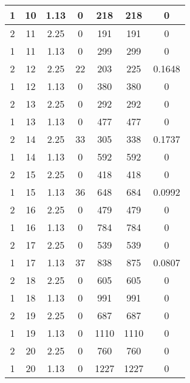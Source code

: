\documentclass[letterpaper, 12pt]{article}
\begin{document}
\begin{longtable}{|c|c|c|c|c|c|c|}
\hline
1 & 10 & 1.13 & 0 & 218 & 218 & 0 \\
\hline
2 & 11 & 2.25 & 0 & 191 & 191 & 0 \\
\hline
1 & 11 & 1.13 & 0 & 299 & 299 & 0 \\
\hline
2 & 12 & 2.25 & 22 & 203 & 225 & 0.1648 \\
\hline
1 & 12 & 1.13 & 0 & 380 & 380 & 0 \\
\hline
2 & 13 & 2.25 & 0 & 292 & 292 & 0 \\
\hline
1 & 13 & 1.13 & 0 & 477 & 477 & 0 \\
\hline
2 & 14 & 2.25 & 33 & 305 & 338 & 0.1737 \\
\hline
1 & 14 & 1.13 & 0 & 592 & 592 & 0 \\
\hline
2 & 15 & 2.25 & 0 & 418 & 418 & 0 \\
\hline
1 & 15 & 1.13 & 36 & 648 & 684 & 0.0992 \\
\hline
2 & 16 & 2.25 & 0 & 479 & 479 & 0 \\
\hline
1 & 16 & 1.13 & 0 & 784 & 784 & 0 \\
\hline
2 & 17 & 2.25 & 0 & 539 & 539 & 0 \\
\hline
1 & 17 & 1.13 & 37 & 838 & 875 & 0.0807 \\
\hline
2 & 18 & 2.25 & 0 & 605 & 605 & 0 \\
\hline
1 & 18 & 1.13 & 0 & 991 & 991 & 0 \\
\hline
2 & 19 & 2.25 & 0 & 687 & 687 & 0 \\
\hline
1 & 19 & 1.13 & 0 & 1110 & 1110 & 0 \\
\hline
2 & 20 & 2.25 & 0 & 760 & 760 & 0 \\
\hline
1 & 20 & 1.13 & 0 & 1227 & 1227 & 0 \\
\hline
\end{longtable}
\end{document}
